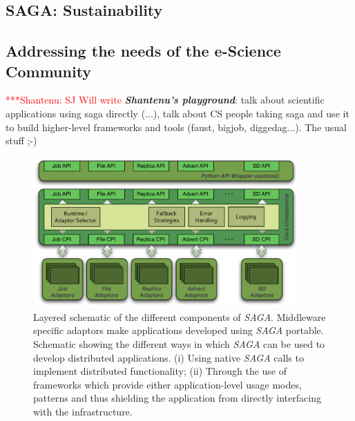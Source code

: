 \documentclass[a4paper,10pt]{article}
\newcommand{\BI}[1]{\textbf{\textit{#1}}}
\newcommand{\sagaimpl}{\textit{SAGA}\xspace}
\newcommand{\impl}{\sagaimpl}
\newcommand{\jhanote}[1]{  {\textcolor{red}     { ***Shantenu: #1 }}}
\newcommand{\jhanote}[1]{}
\begin{document}
\subsection*{SAGA: Sustainability}

\subsection*{Addressing the needs of the e-Science Community}
\jhanote{SJ Will write} \BI{Shantenu's playground}: talk about
scientific applications using saga directly (...), talk about CS
people taking saga and use it to build higher-level frameworks and
tools (faust, bigjob, diggedag...). The usual stuff ;-)

\pagebreak

\begin{figure}[hb]
  \centering
  \includegraphics[width=4in]{./figures/saga-architecture}
 \vspace{-1em}	
  \caption{\footnotesize Layered schematic of the different
    components of \impl.  Middleware specific adaptors make
    applications developed using \impl portable.  Schematic showing
    the different ways in which \impl can be used to develop
    distributed applications. (i) Using native \impl calls to
    implement distributed functionality; (ii) Through the use of
    frameworks which provide either application-level usage modes,
    patterns and thus shielding the application from directly
    interfacing with the infrastructure.}
  \label{fig:saga_arch}
\end{figure}

  
 
\end{document}

